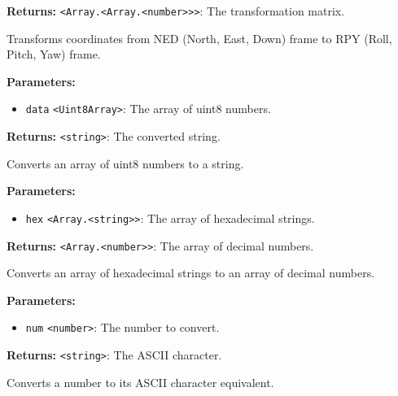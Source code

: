 \documentclass[12pt,a4paper]{article}
\begin{document}
\noindent \textbf{Returns:} \texttt{<Array.<Array.<number>>>}: The transformation matrix.

\noindent Transforms coordinates from NED (North, East, Down) frame to RPY (Roll, Pitch, Yaw) frame.

\vspace{5mm}
\noindent {}


\noindent \textbf{Parameters:}
\begin{itemize}
  \item \texttt{data} \texttt{<Uint8Array>}: The array of uint8 numbers.
\end{itemize}

\noindent \textbf{Returns:} \texttt{<string>}: The converted string.

\noindent Converts an array of uint8 numbers to a string.

\vspace{5mm}
\noindent {}


\noindent \textbf{Parameters:}
\begin{itemize}
  \item \texttt{hex} \texttt{<Array.<string>>}: The array of hexadecimal strings.
\end{itemize}

\noindent \textbf{Returns:} \texttt{<Array.<number>>}: The array of decimal numbers.

\noindent Converts an array of hexadecimal strings to an array of decimal numbers.

\vspace{5mm}
\noindent {}


\noindent \textbf{Parameters:}
\begin{itemize}
  \item \texttt{num} \texttt{<number>}: The number to convert.
\end{itemize}

\noindent \textbf{Returns:} \texttt{<string>}: The ASCII character.

\noindent Converts a number to its ASCII character equivalent.
\end{document}
